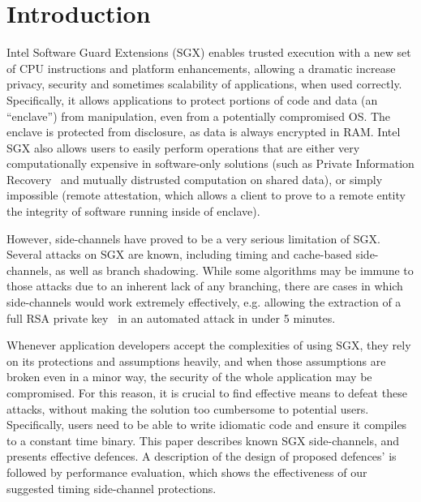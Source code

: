 \documentclass[sigplan, review]{acmart}
\begin{document}
\section{Introduction}
Intel Software Guard Extensions (SGX) enables trusted execution with a new set of CPU instructions and platform enhancements, allowing a dramatic increase privacy, security and sometimes scalability of applications, when used correctly. Specifically, it allows applications to protect portions of code and data (an ``enclave'') from manipulation, even from a potentially compromised OS. The enclave is protected from disclosure, as data is always encrypted in RAM. Intel SGX also allows users to easily perform operations that are either very computationally expensive in software-only solutions (such as Private Information Recovery~\cite{signalprivaterecovery} and mutually distrusted computation on shared data), or simply impossible (remote attestation, which allows a client to prove to a remote entity the integrity of software running inside of enclave).

However, side-channels have proved to be a very serious limitation of SGX. Several attacks on SGX are known, including timing and cache-based side-channels, as well as branch shadowing. While some algorithms may be immune to those attacks due to an inherent lack of any branching, there are cases in which side-channels would work extremely effectively, e.g. allowing the extraction of a full RSA private key~\cite{schwarz2017malware} in an automated attack in under 5 minutes.

Whenever application developers accept the complexities of using SGX, they rely on its protections and assumptions heavily, and when those assumptions are broken even in a minor way, the security of the whole application may be compromised. For this reason, it is crucial to find effective means to defeat these attacks, without making the solution too cumbersome to potential users. Specifically, users need to be able to write idiomatic code and ensure it compiles to a constant time binary.
This paper describes known SGX side-channels, and presents effective defences. A description of the design of proposed defences' is followed by performance evaluation, which shows the effectiveness of our suggested timing side-channel protections.
\end{document}
